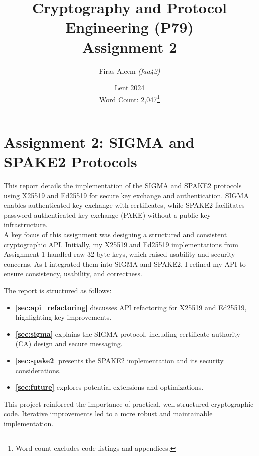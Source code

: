 \documentclass[twoside,a4paper,12pt]{article}
\title{\textbf{Cryptography and Protocol Engineering (P79)\\ Assignment 2}}
\author{Firas Aleem \textsl{(faa42)}}
\date{Lent 2024 \\\vspace{0.5cm} {\small Word Count: 2,047}\footnote{Word count excludes code listings and appendices.}}
\begin{document}

\maketitle
\thispagestyle{empty}
\newpage

\newcommand{\smalltt}[1]{\texttt{\small #1}}


\section*{Assignment 2: SIGMA and SPAKE2 Protocols}
\label{sec:introduction}

This report details the implementation of the SIGMA and SPAKE2 protocols using X25519 and Ed25519 for secure key exchange and authentication. SIGMA enables authenticated key exchange with certificates, while SPAKE2 facilitates password-authenticated key exchange (PAKE) without a public key infrastructure. \\

A key focus of this assignment was designing a structured and consistent cryptographic API. Initially, my X25519 and Ed25519 implementations from Assignment 1 \cite{aleem2024curve25519} handled raw 32-byte keys, which raised usability and security concerns. As I integrated them into SIGMA and SPAKE2, I refined my API to ensure consistency, usability, and correctness.

The report is structured as follows:
\begin{itemize}
\item \textbf{\autoref{sec:api_refactoring}} discusses API refactoring for X25519 and Ed25519, highlighting key improvements.
\item \textbf{\autoref{sec:sigma}} explains the SIGMA protocol, including certificate authority (CA) design and secure messaging.
\item \textbf{\autoref{sec:spake2}} presents the SPAKE2 implementation and its security considerations.
\item \textbf{\autoref{sec:future}} explores potential extensions and optimizations.
\end{itemize}

This project reinforced the importance of practical, well-structured cryptographic code. Iterative improvements led to a more robust and maintainable implementation.

\end{document}

